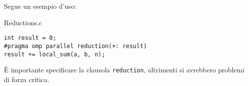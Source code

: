 Segue un esempio d'uso:

\begin{codeblock}{Reductions.c}
    \begin{lstlisting}[langauge = c]
int result = 0;
#pragma omp parallel reduction(+: result)
result += local_sum(a, b, n);\end{lstlisting}
\end{codeblock}

È importante specificare la clausola \verb|reduction|, altrimenti si avrebbero problemi di forza critica.